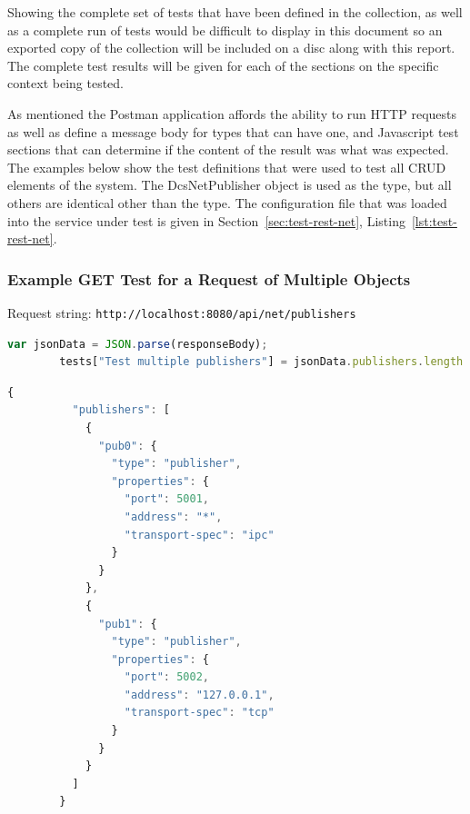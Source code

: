     Showing the complete set of tests that have been defined in the collection,
    as well as a complete run of tests would be difficult to display in this
    document so an exported copy of the collection will be included on a disc
    along with this report. The complete test results will be given for each of
    the sections on the specific context being tested.

    As mentioned the Postman application affords the ability to run HTTP
    requests as well as define a message body for types that can have one, and
    Javascript test sections that can determine if the content of the result
    was what was expected. The examples below show the test definitions that
    were used to test all CRUD elements of the system. The DcsNetPublisher
    object is used as the type, but all others are identical other than the
    type. The configuration file that was loaded into the service under test is
    given in Section~\ref{sec:test-rest-net}, Listing~\ref{lst:test-rest-net}.

    \subsubsection{Example GET Test for a Request of Multiple Objects}\label{sec:test-rest-get-mult}

      Request string: \texttt{http://localhost:8080/api/net/publishers}

      \begin{lstlisting}[language=Javascript,title=GET Multiple Objects Tests,nolol]
        var jsonData = JSON.parse(responseBody);
        tests["Test multiple publishers"] = jsonData.publishers.length === 2;
      \end{lstlisting}

      \begin{lstlisting}[language=Javascript,title=GET Multiple Objects Response,nolol]
        {
          "publishers": [
            {
              "pub0": {
                "type": "publisher",
                "properties": {
                  "port": 5001,
                  "address": "*",
                  "transport-spec": "ipc"
                }
              }
            },
            {
              "pub1": {
                "type": "publisher",
                "properties": {
                  "port": 5002,
                  "address": "127.0.0.1",
                  "transport-spec": "tcp"
                }
              }
            }
          ]
        }
      \end{lstlisting}


